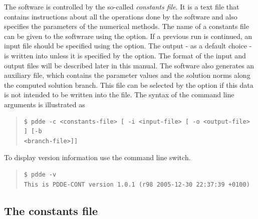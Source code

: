 \documentclass[10pt,a4paper]{ddedoc}
\begin{document}
The software is controlled by the so-called \emph{constants file}. It is a text file
that contains instructions about all the operations done by the software and
also specifies the parameters of the numerical methods.
The name of a constants file can be given to the softwrare using the  option.
If a previous run is continued, an input file should be specified using the  option. 
The output - as a default choice - is written into  unless it is specified
by the  option. The format of the input and output files will
be described later in this manual. The software also generates an auxiliary file,
which contains the parameter values and the solution norms along the computed
solution branch.
This file can be selected by the  option if this data is not intended
to be written into the  file. The syntax of the command line
arguments is illustrated as
{ \small \begin{quote} \begin{lstlisting}[basicstyle=\tt,frame=single]
$ pdde -c <constants-file> [ -i <input-file> [ -o <output-file> ] [-b
<branch-file>]]
\end{lstlisting} \end{quote} } \noindent
To display version information use the  command line switch.
{ \small \begin{quote} \begin{lstlisting}[basicstyle=\tt,frame=single]
$ pdde -v
This is PDDE-CONT version 1.0.1 (r98 2005-12-30 22:37:39 +0100)
\end{lstlisting} \end{quote} } \noindent


\subsection{The constants file}
\label{constfile}
\end{document}
